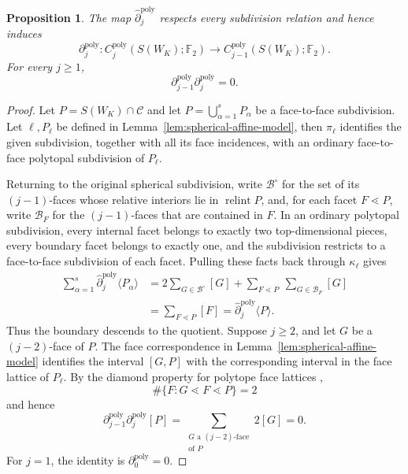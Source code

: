 \documentclass[reqno,12pt]{amsart}
\newtheorem{proposition}[theorem]{Proposition}
\theoremstyle{definition}
\DeclareMathOperator{\relint}{relint}
\newcommand{\F}{\mathbb F_2}
\begin{document}
\begin{proposition}
\label{prop:polyhedral-boundary}
The map \(\widehat\partial_j^{\mathrm{poly}}\) respects every
subdivision relation and hence induces
\[
 \partial_j^{\mathrm{poly}}:
 C_j^{\mathrm{poly}}(S(W_K);\F)
 \longrightarrow C_{j-1}^{\mathrm{poly}}(S(W_K);\F).
\]
For every \(j\geq1\),
\[
 \partial_{j-1}^{\mathrm{poly}}\partial_j^{\mathrm{poly}}=0.
\]
\end{proposition}

\begin{proof}
Let \(P=S(W_K)\cap\mathcal C\) and let
\(P=\bigcup_{\alpha=1}^sP_\alpha\) be a face-to-face subdivision.
Let \(\ell,P_\ell\) be defined in
Lemma~\ref{lem:spherical-affine-model}, then \(\pi_\ell\) identifies
the given subdivision, together with all its face incidences, with an
ordinary face-to-face polytopal subdivision of \(P_\ell\).

Returning to the original spherical subdivision, write
\(\mathcal B^\circ\) for the set of its \((j-1)\)-faces whose relative
interiors lie in \(\relint P\), and, for each facet \(F\lessdot P\),
write \(\mathcal B_F\) for the \((j-1)\)-faces that are contained in
\(F\).
In an ordinary polytopal subdivision, every internal facet belongs to
exactly two top-dimensional pieces, every boundary facet belongs to
exactly one, and the subdivision restricts to a face-to-face
subdivision of each facet.  Pulling these facts back through
\(\kappa_\ell\) gives
\[
 \begin{aligned}
 \sum_{\alpha=1}^s
   \widehat\partial_j^{\mathrm{poly}}\langle P_\alpha\rangle
 &=2\sum_{G\in\mathcal B^\circ}[G]
   +\sum_{F\lessdot P}\ \sum_{G\in\mathcal B_F}[G]\\
 &=\sum_{F\lessdot P}[F]
  =\widehat\partial_j^{\mathrm{poly}}\langle P\rangle.
 \end{aligned}
\]
Thus the boundary descends to the quotient.  Suppose \(j\geq2\), and
let \(G\) be a \((j-2)\)-face of \(P\).  The face correspondence in
Lemma~\ref{lem:spherical-affine-model} identifies the interval
\([G,P]\) with the corresponding interval in the face lattice of
\(P_\ell\).  By the diamond property for polytope face lattices
\cite[Theorem~2.7(iii)]{Ziegler},
\[
 \#\{F:G\lessdot F\lessdot P\}=2
\]
and hence
\[
 \partial_{j-1}^{\mathrm{poly}}
 \partial_j^{\mathrm{poly}}[P]
 =\sum_{\substack{G\text{ a }(j-2)\text{-face}\\\text{of }P}}2[G]=0.
\]
For \(j=1\), the identity is \(\partial_0^{\mathrm{poly}}=0\).
\end{proof}
\end{document}

